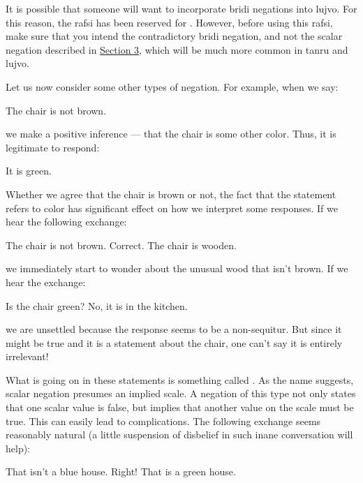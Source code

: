 It is possible that someone will want to incorporate bridi
    negations into lujvo. For this reason, the rafsi  has
    been reserved for . However, before using this rafsi,
    make sure that you intend the contradictory bridi negation, and
    not the scalar negation described in \hyperref[sec:15:3]{Section
    3}, which will be much more common in tanru and lujvo.



Let us now consider some other types of negation. For
    example, when we say:
\begin{example}
The chair is not brown.
\end{example}

{\noindent}we make a positive inference --- that the chair is some other
    color. Thus, it is legitimate to respond:
\begin{example}
It is green.
\end{example}

Whether we agree that the chair is brown or not, the fact
    that the statement refers to color has significant effect on
    how we interpret some responses. If we hear the following
    exchange:
\begin{example}
The chair is not brown.\n
Correct.  The chair is wooden.
\end{example}

{\noindent}we immediately start to wonder about the unusual wood that
    isn't brown. If we hear the exchange:
\begin{example}
Is the chair green?\n
No, it is in the kitchen.
\end{example}

{\noindent}we are unsettled because the response seems to be a
    non-sequitur. But since it might be true and it is a statement
    about the chair, one can't say it is entirely irrelevant! 

What is going on in these statements is something called
    . As the name suggests, scalar negation
    presumes an implied scale. A negation of this type not only
    states that one scalar value is false, but implies that another
    value on the scale must be true. This can easily lead to
    complications. The following exchange seems reasonably natural
    (a little suspension of disbelief in such inane conversation
    will help):
\begin{example}
That isn't a blue house.\n
Right! That is a green house.
\end{example}

